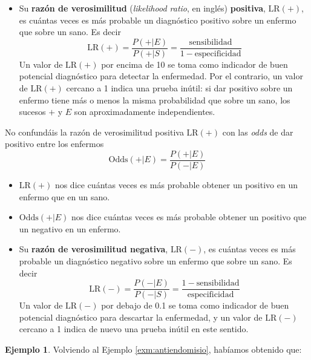\documentclass[
]{book}
\providecommand{\tightlist}{%
  \setlength{\itemsep}{0pt}\setlength{\parskip}{0pt}}
\theoremstyle{definition}
\theoremstyle{definition}
\newtheorem{example}{Ejemplo}[chapter]
\theoremstyle{definition}
\theoremstyle{definition}
\theoremstyle{remark}
\begin{document}
\begin{itemize}
\tightlist
\item
  Su \textbf{razón de verosimilitud} (\emph{likelihood ratio}, en inglés) \textbf{positiva}, \(\text{LR}(+)\), es cuántas veces es más probable un diagnóstico positivo sobre un enfermo que sobre un sano. Es decir
  \[
  \text{LR}(+)=\dfrac{P(+|E)}{P(+|S)}=\dfrac{\text{sensibilidad}}{1-\text{especificidad}}
  \]
  Un valor de \(\text{LR}(+)\) por encima de 10 se toma como indicador de buen potencial diagnóstico para detectar la enfermedad. Por el contrario, un valor de \(\text{LR}(+)\) cercano a 1 indica una prueba inútil: si dar positivo sobre un enfermo tiene más o menos la misma probabilidad que sobre un sano, los sucesos \(+\) y \(E\) son aproximadamente independientes.
\end{itemize}

\begin{rmdcaution}
No confundáis la razón de verosimilitud positiva \(\text{LR}(+)\) con las \emph{odds} de dar positivo entre los enfermos
\[
\text{Odds}(+|E)= \dfrac{P(+|E)}{P(-|E)}
\]

\begin{itemize}
\item
  \(\text{LR}(+)\) nos dice cuántas veces es más probable obtener un positivo en un enfermo que en un sano.
\item
  \(\text{Odds}(+|E)\) nos dice cuántas veces es más probable obtener un positivo que un negativo en un enfermo.
\end{itemize}
\end{rmdcaution}

\begin{itemize}
\tightlist
\item
  Su \textbf{razón de verosimilitud negativa}, \(\text{LR}(-)\), es cuántas veces es más probable un diagnóstico negativo sobre un enfermo que sobre un sano. Es decir
  \[
  \text{LR}(-)=\dfrac{P(-|E)}{P(-|S)}=\dfrac{1-\text{sensibilidad}}{\text{especificidad}}
  \]
  Un valor de \(\text{LR}(-)\) por debajo de 0.1 se toma como indicador de buen potencial diagnóstico para descartar la enfermedad, y un valor de \(\text{LR}(-)\) cercano a 1 indica de nuevo una prueba inútil en este sentido.
\end{itemize}

\begin{example}
\protect\hypertarget{exm:unnamed-chunk-161}{}\label{exm:unnamed-chunk-161}Volviendo al Ejemplo \ref{exm:antiendomisio}, habíamos obtenido que:
\end{example}
\end{document}

